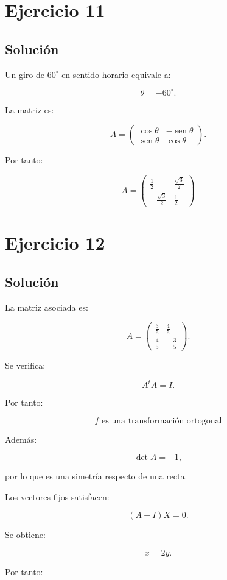 \documentclass[11pt,a4paper]{article}
\newcommand{\sen}{\operatorname{sen}}
\begin{document}
\section{Ejercicio 11}
\subsection{Solución}

Un giro de \(60^\circ\) en sentido horario equivale a:

\[
\theta=-60^\circ.
\]

La matriz es:

\[
A=
\begin{pmatrix}
\cos\theta&-\sen\theta\\
\sen\theta&\cos\theta
\end{pmatrix}.
\]

Por tanto:

\[
\boxed{
A=
\begin{pmatrix}
\frac12&\frac{\sqrt3}{2}\\[1mm]
-\frac{\sqrt3}{2}&\frac12
\end{pmatrix}
}
\]

\section{Ejercicio 12}
\subsection{Solución}

La matriz asociada es:

\[
A=
\begin{pmatrix}
\frac35&\frac45\\[1mm]
\frac45&-\frac35
\end{pmatrix}.
\]

Se verifica:

\[
A^tA=I.
\]

Por tanto:

\[
\boxed{
f\text{ es una transformación ortogonal}
}
\]

Además:

\[
\det A=-1,
\]

por lo que es una simetría respecto de una recta.

Los vectores fijos satisfacen:

\[
(A-I)X=0.
\]

Se obtiene:

\[
x=2y.
\]

Por tanto:
\end{document}
